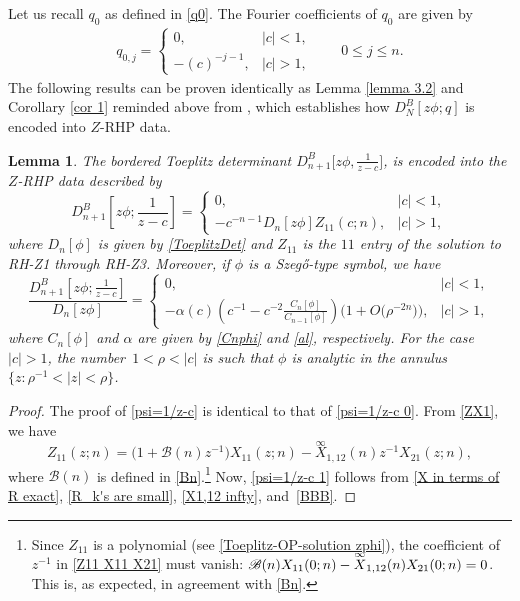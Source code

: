 \documentclass[pdftex]{sigma}
\numberwithin{equation}{section}
\newtheorem{Lemma}[Theorem]{Lemma}
 { \theoremstyle{definition}
\newtheorem{Definition}[Theorem]{Definition}
\newtheorem{Example}[Theorem]{Example}
\newtheorem{Remark}[Theorem]{Remark}
\newtheorem{Question}[Theorem]{Question}
}
\newcommand{\al}{\alpha}
\newcommand{\di}{\displaystyle}
\begin{document}
Let us recall $q_0$ as defined in \eqref{q0}. The Fourier coefficients of $q_0$ are given by
		\begin{gather*}%
			q_{0,j} = \begin{cases}
				0, & |c|<1, \\
				-(c)^{-j-1}, & |c|>1,
			\end{cases}\qquad 0\leq j \leq n.
		\end{gather*}
		The following results can be proven identically as Lemma \ref{lemma 3.2} and Corollary \ref{cor 1} reminded above from \cite{BEGIL}, which establishes how $D^B_{N}[z\phi;q]$ is encoded into $Z$-RHP data.
		\begin{Lemma}\label{lem 2.15}
			The bordered Toeplitz determinant $D^B_{n+1}\big[z\phi,\di \tfrac{1}{z-c}\big]$, is encoded into the $Z$-RHP data described by
			\begin{equation}\label{psi=1/z-c}
				D^B_{n+1}\left[z\phi;\frac{1}{z-c}\right] = \begin{cases}
					0, & |c|<1, \\
					-c^{-n-1}D_{n}[z\phi]Z_{11}(c;n), & |c|>1,
				\end{cases}
			\end{equation}
			where $D_{n}[\phi]$ is given by \eqref{ToeplitzDet} and $Z_{11}$ is the $11$ entry of the solution to {\rm RH-Z1} through {\rm RH-Z3}. Moreover, if $\phi$ is a Szeg\H{o}-type symbol, we have
			\begin{equation}\label{psi=1/z-c 1}
				\frac{D^B_{n+1}\left[z\phi;\di \frac{1}{z-c}\right]}{D_{n}[z\phi]}	 = \begin{cases}
					0, & |c|<1, \\
					\di	- \al(c) \left( c^{-1} - c^{-2} \frac{C_n[\phi]}{C_{n-1}[\phi]} \right) \big(1 + O\big(\rho^{-2n}\big)\big), & |c|>1,
				\end{cases}
			\end{equation}
			where $C_n[\phi]$ and
			$\al$ are given by \eqref{Cnphi} and \eqref{al}, respectively. For the case $|c|>1$, the number~${1<\rho < |c|}$ is such that $\phi$ is analytic in the annulus $\big\{z\colon \rho^{-1}<|z|<\rho\big\}$.
		\end{Lemma}
		\begin{proof}
			The proof of \eqref{psi=1/z-c} is identical to that of \eqref{psi=1/z-c 0}. From \eqref{ZX1}, we have
			\begin{equation}\label{Z11 X11 X21}
				Z_{11}(z;n) = \big( 1 + \mathscr{B}(n) z^{-1} \big) X_{11}(z;n) -\overset{\infty}{X}_{1,12}(n) z^{-1} X_{21}(z;n),
			\end{equation}
			where $\mathscr{B}(n)$ is defined in \eqref{Bn}.\footnote{Since $Z_{11}$ is a polynomial (see \eqref{Toeplitz-OP-solution zphi}), the coefficient of $z^{-1}$ in \eqref{Z11 X11 X21} must vanish: $\mathscr{B}(n) X_{11}(0;n) -\smash{\overset{\infty}{X}}_{1,12}(n) X_{21}(0;n) = 0$. This is, as expected, in agreement with \eqref{Bn}.} Now, \eqref{psi=1/z-c 1} follows from \eqref{X in terms of R exact}, \eqref{R_k's are small}, \eqref{X1,12 infty}, and~\eqref{BBB}.
		\end{proof}
		
\end{document}

